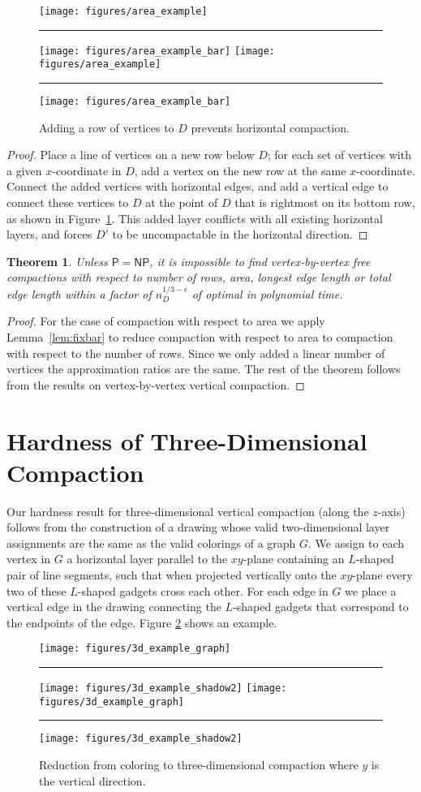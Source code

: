 \documentclass[12pt]{article}
\newtheorem{theorem}{Theorem}
\theoremstyle{definitions}
\renewcommand{\P}{\mathsf{P}}
\newcommand{\NP}{\mathsf{NP}}
\begin{document}
\begin{figure}[t]
\centering
\ifFull
\texttt{[image: figures/area\_example]}\rule{2em}{0em}
\texttt{[image: figures/area\_example\_bar]}
\else
\texttt{[image: figures/area\_example]}\rule{2em}{0em}
\texttt{[image: figures/area\_example\_bar]}
\fi
\caption{Adding a row of vertices to $D$ prevents  horizontal compaction.}
\label{fig:uncompactable}
\end{figure}
\begin{proof}
Place a line of vertices on a new row below $D$; for each set of vertices with a given $x$-coordinate in $D$, add a vertex on the new row at the
same $x$-coordinate. Connect the added
vertices with horizontal edges, and add a vertical edge to connect these vertices to $D$ at the point of $D$ that is rightmost on its bottom row, as shown in Figure~\ref{fig:uncompactable}. This added layer conflicts with all
existing horizontal layers, and forces $D'$ to be uncompactable in the
horizontal direction.
\end{proof}

\begin{theorem}
Unless $\P= \NP$, it is impossible to find vertex-by-vertex free compactions with respect to number of rows, area, longest edge length or total edge length within a factor of $n_D^{1/3-\epsilon}$ of optimal in polynomial time.
\end{theorem}
\begin{proof}
For the case of compaction with respect to area we apply Lemma~\ref{lem:fixbar} to reduce compaction with respect to area to compaction with respect to the number of rows. Since we only added a linear number of vertices the approximation ratios are the same. The rest of the theorem follows from the results on vertex-by-vertex vertical compaction.
\end{proof}

\section{Hardness of Three-Dimensional Compaction}
Our hardness result for three-dimensional vertical compaction (along the $z$-axis) follows from the construction of a drawing whose valid two-dimensional layer assignments are the same as the valid colorings of a graph $G$. We assign to each vertex in $G$ a horizontal layer parallel to the $xy$-plane containing an $L$-shaped pair of line segments, such that when projected vertically onto the $xy$-plane every two of these $L$-shaped gadgets cross each other. For each edge in $G$ we place a vertical edge in the drawing connecting the $L$-shaped gadgets that correspond to the endpoints of the edge. Figure \ref{fig:3dredux} shows an example.
\begin{figure}[b]
\centering
\ifFull
\texttt{[image: figures/3d\_example\_graph]}\rule{4em}{0em}
\texttt{[image: figures/3d\_example\_shadow2]}
\else
\texttt{[image: figures/3d\_example\_graph]}\rule{4em}{0em}
\texttt{[image: figures/3d\_example\_shadow2]}
\fi
\caption{Reduction from coloring to three-dimensional compaction where $y$ is the vertical direction.}
\label{fig:3dredux}
\end{figure}
\end{document}
